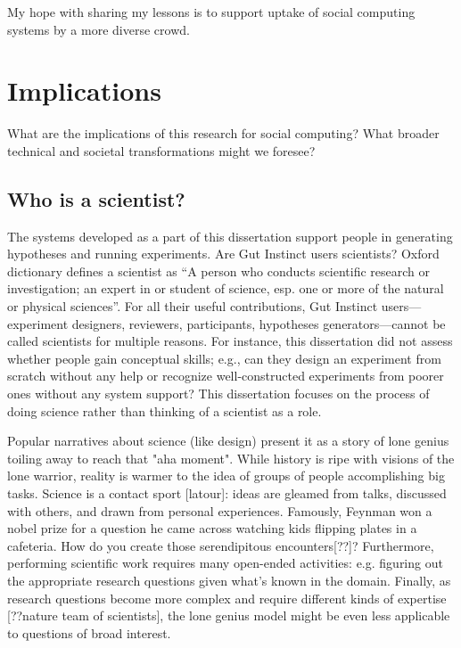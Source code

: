 My hope with sharing my lessons is to support uptake of social computing systems by a more diverse crowd.


\section{Implications}

What are the implications of this research for social computing? What broader technical and societal transformations might we foresee?

\subsection{Who is a scientist?}
The systems developed as a part of this dissertation support people in generating hypotheses and running experiments. Are Gut Instinct users scientists? Oxford dictionary defines a scientist as “A person who conducts scientific research or investigation; an expert in or student of science, esp. one or more of the natural or physical sciences”. For all their useful contributions, Gut Instinct users---experiment designers, reviewers, participants, hypotheses generators---cannot be called scientists for multiple reasons. For instance, this dissertation did not assess whether people gain conceptual skills; e.g., can they design an experiment from scratch without any help or recognize well-constructed experiments from poorer ones without any system support? This dissertation focuses on the process of doing science rather than thinking of a scientist as a role. 

Popular narratives about science (like design) present it as a story of lone genius toiling away to reach that "aha moment". While history is ripe with visions of the lone warrior, reality is warmer to the idea of groups of people accomplishing big tasks. Science is a contact sport [latour]: ideas are gleamed from talks, discussed with others, and drawn from personal experiences. Famously, Feynman won a nobel prize for a question he came across watching kids flipping plates in a cafeteria. How do you create those serendipitous encounters[??]? Furthermore, performing scientific work requires many open-ended activities: e.g. figuring out the appropriate research questions given what’s known in the domain. Finally, as research questions become more complex and require different kinds of expertise [??nature team of scientists], the lone genius model might be even less applicable to questions of broad interest. 

